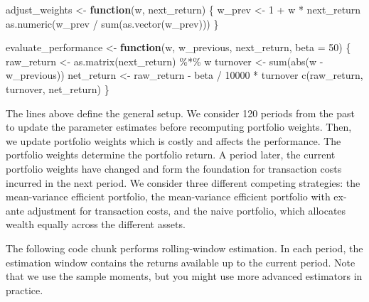 \documentclass[
]{book}
\newenvironment{Shaded}{\begin{snugshade}}{\end{snugshade}}
\newcommand{\AttributeTok}[1]{\textcolor[rgb]{0.61,0.61,0.61}{#1}}
\newcommand{\ControlFlowTok}[1]{\textcolor[rgb]{0.27,0.27,0.27}{\textbf{#1}}}
\newcommand{\DecValTok}[1]{\textcolor[rgb]{0.06,0.06,0.06}{#1}}
\newcommand{\FunctionTok}[1]{\textcolor[rgb]{0,0,0}{#1}}
\newcommand{\NormalTok}[1]{#1}
\newcommand{\OtherTok}[1]{\textcolor[rgb]{0.37,0.37,0.37}{#1}}
\newcommand{\SpecialCharTok}[1]{\textcolor[rgb]{0,0,0}{#1}}
\begin{document}
\begin{Shaded}
\begin{Highlighting}[]
\NormalTok{adjust\_weights }\OtherTok{\textless{}{-}} \ControlFlowTok{function}\NormalTok{(w, next\_return) \{}
\NormalTok{  w\_prev }\OtherTok{\textless{}{-}} \DecValTok{1} \SpecialCharTok{+}\NormalTok{ w }\SpecialCharTok{*}\NormalTok{ next\_return}
  \FunctionTok{as.numeric}\NormalTok{(w\_prev }\SpecialCharTok{/} \FunctionTok{sum}\NormalTok{(}\FunctionTok{as.vector}\NormalTok{(w\_prev)))}
\NormalTok{\}}

\NormalTok{evaluate\_performance }\OtherTok{\textless{}{-}} \ControlFlowTok{function}\NormalTok{(w, w\_previous, next\_return, }\AttributeTok{beta =} \DecValTok{50}\NormalTok{) \{}
\NormalTok{  raw\_return }\OtherTok{\textless{}{-}} \FunctionTok{as.matrix}\NormalTok{(next\_return) }\SpecialCharTok{\%*\%}\NormalTok{ w}
\NormalTok{  turnover }\OtherTok{\textless{}{-}} \FunctionTok{sum}\NormalTok{(}\FunctionTok{abs}\NormalTok{(w }\SpecialCharTok{{-}}\NormalTok{ w\_previous))}
\NormalTok{  net\_return }\OtherTok{\textless{}{-}}\NormalTok{ raw\_return }\SpecialCharTok{{-}}\NormalTok{ beta }\SpecialCharTok{/} \DecValTok{10000} \SpecialCharTok{*}\NormalTok{ turnover}
  \FunctionTok{c}\NormalTok{(raw\_return, turnover, net\_return)}
\NormalTok{\}}
\end{Highlighting}
\end{Shaded}

The lines above define the general setup. We consider 120 periods from the past to update the parameter estimates before recomputing portfolio weights. Then, we update portfolio weights which is costly and affects the performance. The portfolio weights determine the portfolio return. A period later, the current portfolio weights have changed and form the foundation for transaction costs incurred in the next period. We consider three different competing strategies: the mean-variance efficient portfolio, the mean-variance efficient portfolio with ex-ante adjustment for transaction costs, and the naive portfolio, which allocates wealth equally across the different assets.

The following code chunk performs rolling-window estimation. In each period, the estimation window contains the returns available up to the current period. Note that we use the sample moments, but you might use more advanced estimators in practice.
\end{document}

